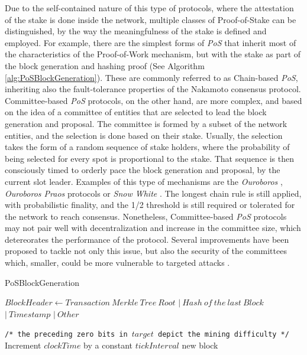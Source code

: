 \documentclass[journal]{IEEEtran}
\newcommand{\LineComment}[1]{\State \texttt{/* #1 */}}
\begin{document}
Due to the self-contained nature of this type of protocols, where the
attestation of the stake is done inside the network, multiple classes
of Proof-of-Stake can be distinguished, by the way the meaningfulness of
the stake is defined and employed. For example, there are the simplest forms of \emph{PoS} that inherit most
of the characteristics of the Proof-of-Work mechanism, but with the
stake as part of the block generation and hashing proof (See Algorithm \ref{alg:PoSBlockGeneration}).
These are commonly referred to as Chain-based \emph{PoS}, inheriting also the
fault-tolerance properties of the Nakamoto consensus protocol.
Committee-based \emph{PoS} protocols, on the other hand, are more complex,
and based on the idea of a committee of entities that are 
selected to lead the block generation and proposal. The committee is
formed by a subset of the network entities, and the selection is done
based on their stake. Usually, the selection takes the form of a random
sequence of stake holders, where the probability of being selected
for every spot is proportional to the stake. That sequence is then 
consciously timed to orderly pace the block generation and proposal, 
by the current slot leader. Examples of this type of mechanisms are
the \emph{Ouroboros} \cite{kiayias2017ouroboros}, \emph{Ouroboros Praos} \cite{david2018ouroboros} protocols
or \emph{Snow White} \cite{daian2019snow}. The longest chain rule is
still applied, with probabilistic finality, and the 1/2 threshold is
still required or tolerated for the network to reach consensus. Nonetheless,
Committee-based \emph{PoS} protocols may not pair well with decentralization and 
increase in the committee size, which detereorates the performance of the
protocol. Several improvements have been proposed to tackle not only this
issue, but also the security of the committees which, smaller, could be more
vulnerable to targeted attacks \cite{david2018ouroboros}.

\begin{algorithm}
  \caption[short]{PoSBlockGeneration}\label{alg:PoSBlockGeneration}
  \begin{algorithmic}[1]
    \Function {}{}
      \State $Block Header \gets Transaction \ Merkle \ Tree \ Root$
      \Indent
        \State $| \ Hash \ of \ the \ last \ Block$
        \State $| \ Timestamp$
        \State $| \ Other$
      \EndIndent
      
      \LineComment{the preceding zero bits in $target$ depict the mining difficulty}
      \State Increment $clockTime$ by a constant $tickInterval$
      \EndWhile
      \State \Return new block
    \EndFunction
  \end{algorithmic}
\end{algorithm}
  
\end{document}
